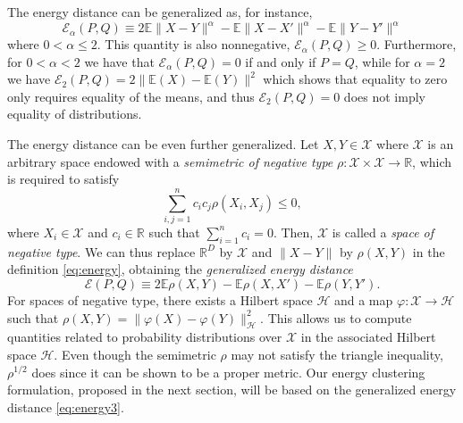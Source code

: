 \documentclass[10pt,journal,compsoc]{IEEEtran}
\newcommand\Energy{\mathcal{E}}
\newcommand\E{\mathbb{E}}
\begin{document}
The energy distance can be generalized as, for instance,
\begin{equation}
\label{eq:energy2}
\Energy_\alpha(P, Q) \equiv 
2 \E \| X - Y\|^{\alpha} - \E \| X - X' \|^{\alpha} - 
\E \| Y - Y' \|^{\alpha}
\end{equation}
where $0<\alpha\le 2$. This quantity is also nonnegative,
$\Energy_\alpha(P,Q) \ge 0$. Furthermore, for $0<\alpha<2$ we have that
$\Energy_\alpha(P,Q) = 0$ if and only if $P=Q$, while for $\alpha=2$ 
we have $\Energy_2(P,Q) = 2\| \E(X) - \E(Y) \|^2$ which shows that
equality to zero only requires
equality of the means, and thus $\Energy_2(P,Q)=0$ does 
not imply equality of distributions. 

The energy distance can be even further generalized.
Let $X, Y \in \mathcal{X}$  where $\mathcal{X}$ is an arbitrary space endowed
with a \emph{semimetric of negative type}
$\rho: \mathcal{X}\times\mathcal{X} \to \mathbb{R}$, which is required
to satisfy
\begin{equation}
\label{eq:negative_type}
\sum_{i,j=1}^n c_i c_j \rho(X_i, X_j) \le 0,
\end{equation}
where $X_i \in \mathcal{X}$ and $c_i \in \mathbb{R}$ such that
$\sum_{i=1}^n c_i = 0$. Then, $\mathcal{X}$ is called a \emph{space of
negative type}.
We can thus replace $\mathbb{R}^D$ by $\mathcal{X}$ and 
$\| X - Y \|$ by $\rho(X , Y)$ in the definition \eqref{eq:energy}, obtaining
the \emph{generalized energy distance}
\begin{equation}
\label{eq:energy3}
\Energy(P, Q) \equiv 2 \E \rho(X,Y) - \E \rho(X, X') - \E \rho(Y,Y').
\end{equation}
For spaces of negative type, there exists a Hilbert space $\mathcal{H}$ and
a map $\varphi: \mathcal{X} \to
\mathcal{H}$ such that
$\rho(X, Y) = \| \varphi(X) - \varphi(Y) \|_{\mathcal{H}}^2$. This
allows us to compute quantities related to probability distributions over
$\mathcal{X}$ in the associated Hilbert space $\mathcal{H}$.
Even though the semimetric 
$\rho$ may not satisfy the triangle inequality, 
$\rho^{1/2}$ does since it can be shown to be a proper metric. 
Our energy clustering formulation, proposed in the next section,
will be based on the generalized
energy distance \eqref{eq:energy3}.
\end{document}
